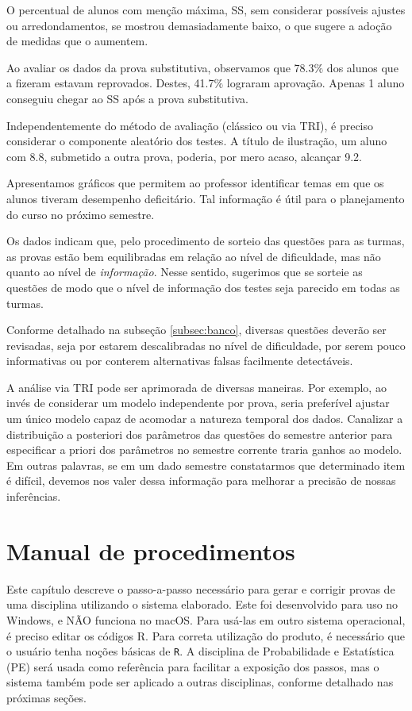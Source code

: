 \documentclass[a4paper]{report}
\begin{document}
O percentual de alunos com menção máxima, SS, sem considerar possíveis
ajustes ou arredondamentos, se mostrou demasiadamente baixo, o que
sugere a adoção de medidas que o aumentem.

Ao avaliar os dados da prova substitutiva, observamos que 78.3\(\%\) dos
alunos que a fizeram estavam reprovados. Destes, 41.7\(\%\) lograram
aprovação. Apenas 1 aluno conseguiu chegar ao SS após a prova
substitutiva.

Independentemente do método de avaliação (clássico ou via TRI), é
preciso considerar o componente aleatório dos testes. A título de
ilustração, um aluno com 8.8, submetido a outra prova, poderia, por mero
acaso, alcançar 9.2.

Apresentamos gráficos que permitem ao professor identificar temas em que
os alunos tiveram desempenho deficitário. Tal informação é útil para o
planejamento do curso no próximo semestre.

Os dados indicam que, pelo procedimento de sorteio das questões para as
turmas, as provas estão bem equilibradas em relação ao nível de
dificuldade, mas não quanto ao nível de \emph{informação}. Nesse
sentido, sugerimos que se sorteie as questões de modo que o nível de
informação dos testes seja parecido em todas as turmas.

Conforme detalhado na subseção \ref{subsec:banco}, diversas questões
deverão ser revisadas, seja por estarem descalibradas no nível de
dificuldade, por serem pouco informativas ou por conterem alternativas
falsas facilmente detectáveis.

A análise via TRI pode ser aprimorada de diversas maneiras. Por exemplo,
ao invés de considerar um modelo independente por prova, seria
preferível ajustar um único modelo capaz de acomodar a natureza temporal
dos dados. Canalizar a distribuição a posteriori dos parâmetros das
questões do semestre anterior para especificar a priori dos parâmetros
no semestre corrente traria ganhos ao modelo. Em outras palavras, se em
um dado semestre constatarmos que determinado item é difícil, devemos
nos valer dessa informação para melhorar a precisão de nossas
inferências.

\newpage

\BgThispage
\chapter{Manual de procedimentos} \label{cap:Manual}

\newpage

Este capítulo descreve o passo-a-passo necessário para gerar e corrigir
provas de uma disciplina utilizando o sistema elaborado. Este foi
desenvolvido para uso no Windows, e NÃO funciona no macOS. Para usá-las
em outro sistema operacional, é preciso editar os códigos R. Para
correta utilização do produto, é necessário que o usuário tenha noções
básicas de \texttt{R}. A disciplina de Probabilidade e Estatística (PE)
será usada como referência para facilitar a exposição dos passos, mas o
sistema também pode ser aplicado a outras disciplinas, conforme
detalhado nas próximas seções.
\end{document}
